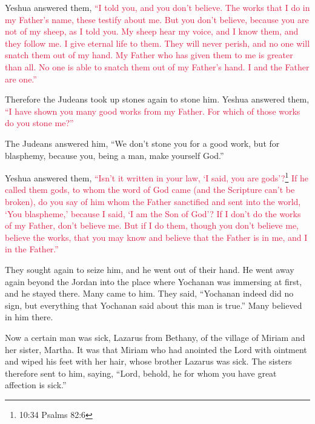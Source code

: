\myverse{}Yeshua answered them,
\textcolor{crimson}{“I told you, and you don’t believe. The works that I do in my Father’s name, these testify about me.
}
\myverse{}\textcolor{crimson}{But you don’t believe, because you are not of my sheep, as I told you.
}
\myverse{}\textcolor{crimson}{My sheep hear my voice, and I know them, and they follow me.
}
\myverse{}\textcolor{crimson}{I give eternal life to them. They will never perish, and no one will
	snatch them out of my hand.
}
\myverse{}\textcolor{crimson}{My Father who has given them to me is greater than all. No one is able
	to snatch them out of my Father’s hand.
}
\myverse{}\textcolor{crimson}{I and the Father are one.”}

\myverse{}Therefore the Judeans took up stones again to stone him.
\myverse{}Yeshua answered them,
\textcolor{crimson}{“I have shown you many good works from my Father. For which of those works do you stone me?”}

\myverse{}The Judeans answered him, “We don’t stone you for a good work,
but for blasphemy, because you, being a man, make yourself God.”

\myverse{}Yeshua answered them,
\textcolor{crimson}{“Isn’t it written in your law, ‘I said, you are gods’?}\footnote{10:34 Psalms 82:6}
\myverse{}\textcolor{crimson}{If he called them gods, to whom the word of God came (and the Scripture
	can’t be broken),
}
\myverse{}\textcolor{crimson}{do you say of him whom the Father sanctified and sent into the world,
	‘You blaspheme,’ because I said, ‘I am the Son of God’?
}
\myverse{}\textcolor{crimson}{If I don’t do the works of my Father, don’t believe me.
}
\myverse{}\textcolor{crimson}{But if I do them, though you don’t believe me, believe the works, that
	you may know and believe that the Father is in me, and I in the Father.”
}

\myverse{}They sought again to seize him, and he went out of their hand.
\myverse{}He went away again beyond the Jordan into the place where Yochanan was immersing
at first, and he stayed there.
\myverse{}Many came to him. They said, “Yochanan indeed did no sign, but everything
that Yochanan said about this man is true.”
\myverse{}Many believed in him there.


\mychapter{} \myverse*{}Now a certain man was sick, Lazarus from Bethany, of the village
of Miriam and her sister, Martha.
\myverse{}It was that Miriam who had anointed the Lord with ointment and wiped his feet
with her hair, whose brother Lazarus was sick.
\myverse{}The sisters therefore sent to him, saying, “Lord, behold, he for whom you have
great affection is sick.”

